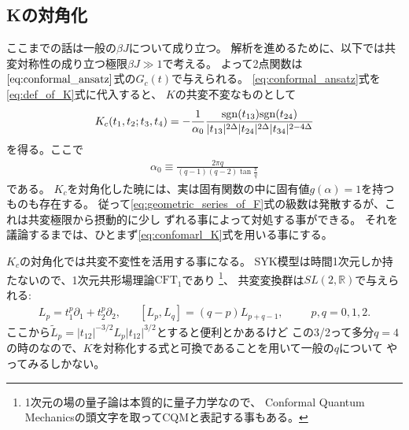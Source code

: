 \subsection{Kの対角化}
ここまでの話は一般の$\beta J$について成り立つ。
解析を進めるために、以下では共変対称性の成り立つ極限$\beta J \gg 1$で考える。
よって2点関数は$\eqref{eq:conformal_ansatz}$式の$G_c(t)$で与えられる。
\eqref{eq:conformal_ansatz}式を\eqref{eq:def_of_K}式に代入すると、
$K$の共変不変なものとして
\begin{align}
	K_c(t_1, t_2; t_3, t_4)
	= -\frac{1}{\alpha_0}
		\frac{\mathrm{sgn}(t_{13})\mathrm{sgn}(t_{24})}{|t_{13}|^{2\Delta}|t_{24}|^{2\Delta}|t_{34}|^{2-4\Delta}}
	\label{eq:confomarl_K}
\end{align}
を得る。ここで
\begin{align}
	\alpha_0 \equiv \frac{2\pi q}{(q-1)(q-2)\tan\frac{\pi}{q}}
\end{align}
である。
$K_c$を対角化した暁には、実は固有関数の中に固有値$g(\alpha) = 1$を持つものも存在する。
従って\eqref{eq:geometric_series_of_F}式の級数は発散するが、これは共変極限から摂動的に少し
ずれる事によって対処する事ができる。
それを議論するまでは、ひとまず\eqref{eq:confomarl_K}式を用いる事にする。

$K_c$の対角化では共変不変性を活用する事になる。
SYK模型は時間1次元しか持たないので、1次元共形場理論$\mathrm{CFT}_1$であり
\footnote{1次元の場の量子論は本質的に量子力学なので、
Conformal Quantum Mechanicsの頭文字を取ってCQMと表記する事もある。}、
共変変換群は$SL(2, \mathbb{R})$で与えられる\cite{andrzejewski}:
\begin{align}
	L_p = t_1^p\partial_1 + t_2^p\partial_2,\hspace{20pt}
	[L_p, L_q] = (q - p)L_{p + q - 1},\hspace{30pt}
	p,q = 0, 1, 2.
\end{align}
ここから$\tilde{L}_p = |t_{12}|^{-3/2}L_p|t_{12}|^{3/2}$とすると便利とかあるけど
この3/2って多分$q=4$の時のなので、$K$を対称化する式と可換であることを用いて一般の$q$について
やってみるしかない。

\pagebreak
